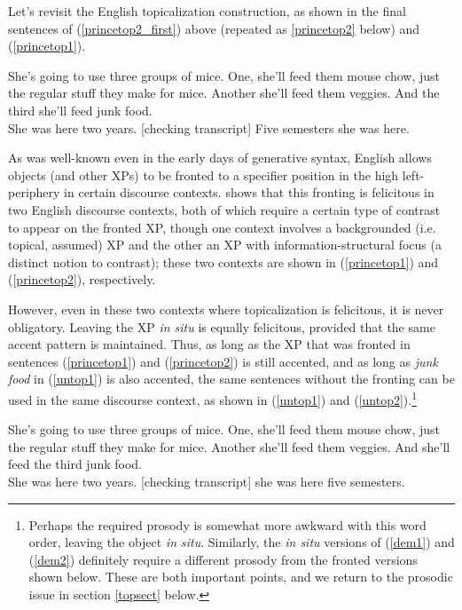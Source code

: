 Let's revisit the English topicalization construction, as shown in the final sentences of (\ref{princetop2_first}) above (repeated as \ref{princetop2} below) and (\ref{princetop1}).

\begin{exe}
\ex \label{princetop1} She's going to use three groups of mice.
One, she'll feed them mouse chow, just the regular stuff they make for
mice.
Another she'll feed them veggies.
And the third she'll feed junk food.\\

\ex \label{princetop2} She was here two years.
[checking transcript] Five semesters she was here.\\
\citep[both examples from][8,9]{prince1999} 

\end{exe}

\noindent As was well-known even in the early days of generative syntax, English allows objects (and other XPs) to be fronted to a specifier position in the high left-periphery in certain discourse contexts.
\citet{prince1985,prince1998, prince1999} shows that this fronting is felicitous in two English discourse contexts, both of which require a certain type of contrast to appear on the fronted XP, though one context involves a backgrounded (i.e. topical, assumed) XP and the other an XP with information-structural focus (a distinct notion to contrast); these two contexts are shown in (\ref{princetop1}) and (\ref{princetop2}), respectively.

However, even in these two contexts where topicalization is felicitous, it is never obligatory.
Leaving the XP \textsl{in situ} is equally felicitous, provided that the same accent pattern is maintained.
Thus, as long as the XP that was fronted in sentences (\ref{princetop1}) and (\ref{princetop2}) is still accented, and as long as \textsl{junk food} in (\ref{untop1}) is also accented, the same sentences without the fronting can be used in the same discourse context, as shown in (\ref{untop1}) and (\ref{untop2}).\footnote{Perhaps the required prosody is somewhat more awkward with this word order, leaving the object \textsl{in situ}.
Similarly, the \textsl{in situ} versions of (\ref{dem1}) and (\ref{dem2}) definitely require a different prosody from the fronted versions shown below.
These are both important points, and we return to the prosodic issue in section \ref{topsect} below.} 

\begin{exe}
\ex \label{untop1} She's going to use three groups of mice.
One, she'll feed them mouse chow, just the regular stuff they make for
mice.
Another she'll feed them veggies.
And she'll feed the third junk food.\\

\ex \label{untop2} She was here two years.
[checking transcript] she was here five semesters.\\
\citep[Adapted from][8,9]{prince1999}
\end{exe}


